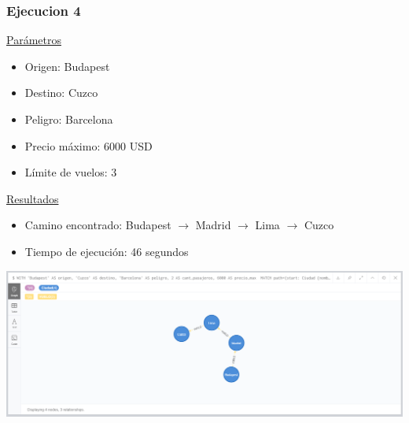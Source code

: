 \documentclass[a4paper,11pt]{article}
\begin{document}
\subsubsection*{Ejecucion 4}
\noindent
\underline{Parámetros}
\begin{itemize}
\item Origen: Budapest
\item Destino: Cuzco
\item Peligro: Barcelona
\item Precio máximo: 6000 USD
\item Límite de vuelos: 3
\end{itemize}
\underline{Resultados}
\begin{itemize}
\item Camino encontrado: Budapest $\rightarrow$ Madrid $\rightarrow$ Lima $\rightarrow$ Cuzco
\item Tiempo de ejecución: 46 segundos
\end{itemize}
\begin{center}
\includegraphics[scale=0.40]{./imagenes/consultaB-ejec4.png}
\end{center}
\end{document}
